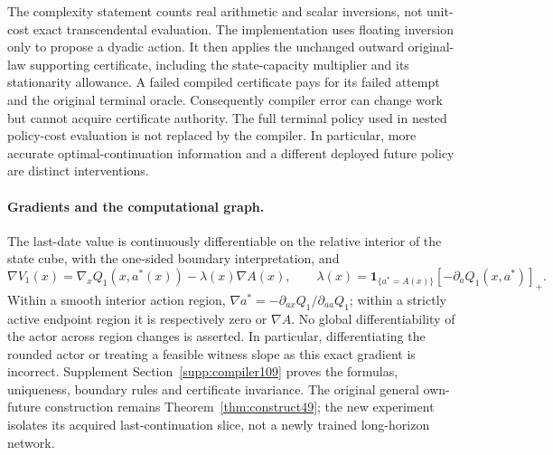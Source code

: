 The complexity statement counts real arithmetic and scalar inversions, not unit-cost exact transcendental evaluation. The implementation uses floating inversion only to propose a dyadic action. It then applies the unchanged outward original-law supporting certificate, including the state-capacity multiplier and its stationarity allowance. A failed compiled certificate pays for its failed attempt and the original terminal oracle. Consequently compiler error can change work but cannot acquire certificate authority. The full terminal policy used in nested policy-cost evaluation is not replaced by the compiler. In particular, more accurate optimal-continuation information and a different deployed future policy are distinct interventions.

\paragraph{Gradients and the computational graph.}
The last-date value is continuously differentiable on the relative interior of the state cube, with the one-sided boundary interpretation, and
\begin{equation}\label{eq:envelope109}
 \nabla V_1(x)=\nabla_xQ_1(x,a^*(x))-\lambda(x)\nabla A(x),\qquad
 \lambda(x)=\boldsymbol1_{\{a^*=A(x)\}}[-\partial_aQ_1(x,a^*)]_+.
\end{equation}
Within a smooth interior action region,
$\nabla a^*=-\partial_{ax}Q_1/\partial_{aa}Q_1$; within a strictly active endpoint region it is respectively zero or $\nabla A$. No global differentiability of the actor across region changes is asserted. In particular, differentiating the rounded actor or treating a feasible witness slope as this exact gradient is incorrect. Supplement Section~\ref{supp:compiler109} proves the formulas, uniqueness, boundary rules and certificate invariance. The original general own-future construction remains Theorem~\ref{thm:construct49}; the new experiment isolates its acquired last-continuation slice, not a newly trained long-horizon network.
